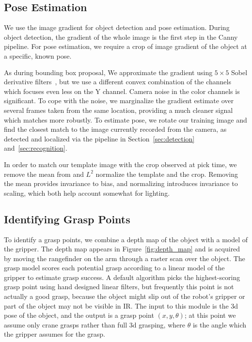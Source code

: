 \documentclass{article}
\begin{document}
 
\subsection{Pose Estimation}

We use the image gradient for object detection and pose estimation. During
object detection, the gradient of the whole image is the first step in the Canny pipeline.
For pose estimation,  we require a crop of  image gradient of the object
at a specific, known pose. 


As during bounding box proposal, We approximate the gradient using 
$5 \times 5$ Sobel derivative filters~\citep{sobel95}, but we use a
different convex combination of the channels which focuses even less
on the Y channel.  Camera noise in the color channels is significant. To
cope with the noise, we marginalize the gradient estimate over several
frames taken from the same location, providing a much cleaner signal which matches more robustly.  To estimate 
pose, we rotate our training image and find the closest match to the 
image currently recorded from the camera, as detected and localized via 
the pipeline in Section~\ref{sec:detection} and~\ref{sec:recognition}.

In order to match our template image with the crop observed at pick time,
we remove the mean from and $L^2$ normalize the template and the crop.
Removing the mean provides invariance to bias, and normalizing introduces
invariance to scaling, which both help account somewhat
for lighting. 

\subsection{Identifying Grasp Points}

To identify a grasp points, we combine a depth map of the object with
a model of the gripper.  The depth map appears in
Figure~\ref{fig:depth_map} and is acquired by moving the rangefinder on the
arm through a raster scan over the object.  The grasp model scores each potential
grasp according to a linear model of the gripper to estimate grasp
success. A default algorithm picks the highest-scoring grasp point
using hand designed linear filters,
but frequently this point is not actually a good grasp, because the
object might slip out of the robot's gripper or part of the object may
not be visible in IR.  The input to this module is the 3d pose of the
object, and the output is a grasp point $(x, y, \theta)$; at this point we
assume only crane grasps rather than full 3d grasping, where $\theta$
is the angle which the gripper assumes for the grasp.
\end{document}
